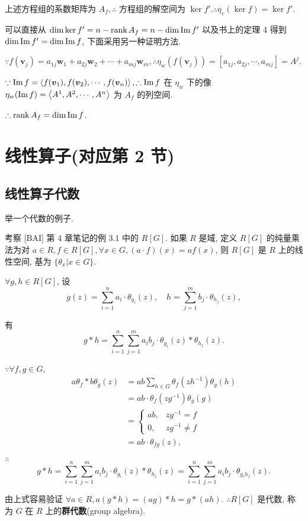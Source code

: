 \documentclass[color=black,device=normal,lang=cn,mode=geye]{elegantnote}
\begin{document}
上述方程组的系数矩阵为 $A_f,\therefore$ 方程组的解空间为 $\ker f'.\therefore\eta_v(\ker f)=\ker f'$.

可以直接从 $\dim\ker f'=n-\operatorname{rank} A_f=n-\dim\operatorname{Im} f'$ 以及书上的定理 4 得到 $\dim\operatorname{Im} f'=\dim\operatorname{Im} f$, 下面采用另一种证明方法.

$\because f(\boldsymbol{v}_j)=a_{1j}\boldsymbol{w}_1+a_{2j}\boldsymbol{w}_2+\cdots+a_{mj}\boldsymbol{w}_m,\therefore\eta_w(f(\boldsymbol{v}_j))=[a_{1j},a_{2j},\cdots,a_{mj}]=A^{j}$.

$\because\operatorname{Im} f=\left<f(\boldsymbol{v}_1),f(\boldsymbol{v}_2),\cdots,f(\boldsymbol{v}_n)\right>,\therefore\operatorname{Im} f$ 在 $\eta_w$ 下的像 $\eta_w(\operatorname{Im} f)=\left<A^{1},A^{2},\cdots,A^{n}\right>$ 为 $A_f$ 的列空间.

$\therefore\operatorname{rank} A_f=\dim\operatorname{Im} f$.
\section{线性算子(对应第 2 节)}
\subsection{线性算子代数}
举一个代数的例子.
\begin{example}
    考察 [BAI] 第 4 章笔记的例 3.1 中的 $R[G]$. 如果 $R$ 是域, 定义 $R[G]$ 的纯量乘法为对 $a\in R,f\in R[G],\forall x\in G,(a\cdot f)(x)=af(x)$, 则 $R[G]$ 是 $R$ 上的线性空间, 基为 $\{\theta_x|x\in G\}$.
    
    $\forall g,h\in R[G]$, 设
    \[g(z)=\sum\limits_{i=1}^{n}a_i\cdot\theta_{g_i}(z),\quad h=\sum\limits_{j=1}^{m}b_j\cdot\theta_{h_j}(z),\]
    
    有
    \[g*h=\sum\limits_{i=1}^{n}\sum\limits_{j=1}^{m}a_ib_j\cdot\theta_{g_i}(z)*\theta_{h_j}(z).\]

    $\because\forall f,g\in G$,
    \begin{align*}
        a\theta_f*b\theta_g(z) & =ab\sum\limits_{h\in G}\theta_f(zh^{-1})\theta_g(h) \\
        & =ab\cdot\theta_f(zg^{-1})\theta_g(g) \\
        & =\begin{cases}
                ab, & zg^{-1}=f \\
                0, & zg^{-1}\neq f
            \end{cases} \\
        & =ab\cdot\theta_{fg}(z),
    \end{align*}

    $\therefore$
    \[g*h=\sum\limits_{i=1}^{n}\sum\limits_{j=1}^{m}a_ib_j\cdot\theta_{g_i}(z)*\theta_{h_j}(z)=\sum\limits_{i=1}^{n}\sum\limits_{j=1}^{m}a_ib_j\cdot\theta_{g_ih_j}(z).\]

    由上式容易验证 $\forall a\in R,a(g*h)=(ag)*h=g*(ah)$. $\therefore R[G]$ 是代数, 称为 $G$ 在 $R$ 上的\textbf{群代数}(group algebra).
\end{example}
\end{document}
